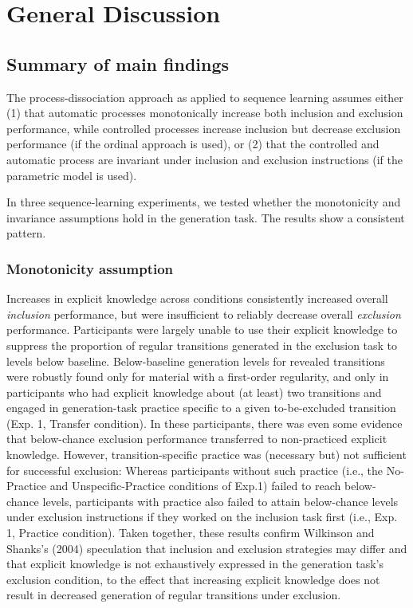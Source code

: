 \documentclass[english,,man]{apa6}
\begin{document}
\hypertarget{general-discussion}{%
\section{General Discussion}\label{general-discussion}}

\hypertarget{summary-of-main-findings}{%
\subsection{Summary of main findings}\label{summary-of-main-findings}}

The process-dissociation approach as applied to sequence learning assumes either
(1) that automatic processes monotonically increase both inclusion and exclusion performance, while controlled processes increase inclusion but decrease exclusion performance (if the ordinal approach is used), or
(2) that the controlled and automatic process are invariant under inclusion and exclusion instructions (if the parametric model is used).

In three sequence-learning experiments, we tested whether the monotonicity and invariance assumptions hold in the generation task.
The results show a consistent pattern.

\hypertarget{monotonicity-assumption}{%
\subsubsection{Monotonicity assumption}\label{monotonicity-assumption}}

Increases in explicit knowledge across conditions consistently increased overall \emph{inclusion} performance, but were insufficient to reliably decrease overall \emph{exclusion} performance.
Participants were largely unable to use their explicit knowledge to suppress the proportion of regular transitions generated in the exclusion task to levels below baseline.
Below-baseline generation levels for revealed transitions were robustly found only for material with a first-order regularity, and only in participants who had explicit knowledge about (at least) two transitions and engaged in generation-task practice specific to a given to-be-excluded transition (Exp. 1, Transfer condition).
In these participants, there was even some evidence that below-chance exclusion performance transferred to non-practiced explicit knowledge.
However, transition-specific practice was (necessary but) not sufficient for successful exclusion:
Whereas participants without such practice (i.e., the No-Practice and Unspecific-Practice conditions of Exp.1) failed to reach below-chance levels,
participants with practice also failed to attain below-chance levels under exclusion instructions if they worked on the inclusion task first (i.e., Exp. 1, Practice condition).
Taken together, these results confirm Wilkinson and Shanks's (2004) speculation that inclusion and exclusion strategies may differ and that explicit knowledge is not exhaustively expressed in the generation task's exclusion condition, to the effect that increasing explicit knowledge does not result in decreased generation of regular transitions under exclusion.
\end{document}
